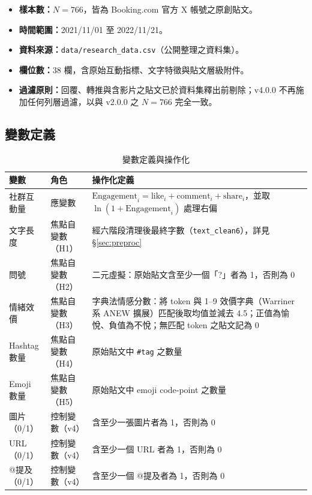 \documentclass[12pt,a4paper]{ctexart}
\begin{document}
\begin{itemize}
    \item \textbf{樣本數：}$N=766$，皆為 Booking.com 官方 X 帳號之原創貼文。
    \item \textbf{時間範圍：}2021/11/01 至 2022/11/21。
    \item \textbf{資料來源：}\texttt{data/research\_data.csv}（公開整理之資料集）。
    \item \textbf{欄位數：}38 欄，含原始互動指標、文字特徵與貼文層級附件。
    \item \textbf{過濾原則：}回覆、轉推與含影片之貼文已於資料集釋出前剔除；v4.0.0 不再施加任何列層過濾，以與 v2.0.0 之 $N=766$ 完全一致。
\end{itemize}

\subsection{變數定義}

\begin{table}[H]
\centering
\caption{變數定義與操作化}
\small
\begin{tabular}{@{}p{} p{} p{}@{}}
\toprule
變數 & 角色 & 操作化定義 \\
\midrule
社群互動量 & 應變數 & $\text{Engagement}_i = \text{like}_i + \text{comment}_i + \text{share}_i$，並取 $\ln(1+\text{Engagement}_i)$ 處理右偏 \\
\midrule
文字長度 & 焦點自變數（H1）& 經六階段清理後最終字數（\texttt{text\_clean6}），詳見 §\ref{sec:preproc} \\
問號 & 焦點自變數（H2）& 二元虛擬：原始貼文含至少一個「?」者為 1，否則為 0 \\
情緒效價 & 焦點自變數（H3）& 字典法情感分數：將 token 與 1--9 效價字典（Warriner 系 ANEW 擴展）匹配後取均值並減去 4.5；正值為愉悅、負值為不悅；無匹配 token 之貼文記為 0 \\
Hashtag 數量 & 焦點自變數（H4）& 原始貼文中 \texttt{\#tag} 之數量 \\
Emoji 數量 & 焦點自變數（H5）& 原始貼文中 emoji code-point 之數量 \\
\midrule
圖片（0/1）& 控制變數（v4）& 含至少一張圖片者為 1，否則為 0 \\
URL（0/1）& 控制變數（v4）& 含至少一個 URL 者為 1，否則為 0 \\
@提及（0/1）& 控制變數（v4）& 含至少一個 @提及者為 1，否則為 0 \\
\bottomrule
\end{tabular}
\end{table}
\end{document}
